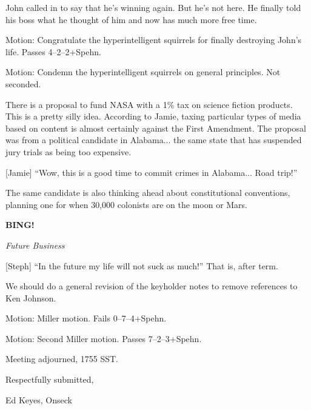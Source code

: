 \documentclass[12pt]{article}
\newcommand{\bing}{{\bf BING!} }
\newcommand{\goto}[1]{\bing \vskip 12pt \centerline{{\em{#1}}}}
\begin{document}
John called in to say that he's winning again.  But he's not here.
He finally told his boss what he thought of him and now has much more
free time.

Motion: Congratulate the hyperintelligent squirrels for finally
destroying John's life.  Passes 4--2--2+Spehn.

Motion: Condemn the hyperintelligent squirrels on general principles.
Not seconded.

There is a proposal to fund NASA with a 1\% tax on science fiction
products.  This is a pretty silly idea.  According to Jamie, taxing
particular types of media based on content is almost certainly against
the First Amendment.  The proposal was from a political candidate in
Alabama... the same state that has suspended jury trials as being too
expensive.

[Jamie] ``Wow, this is a good time to commit crimes in Alabama...
Road trip!''

The same candidate is also thinking ahead about constitutional conventions,
planning one for when 30,000 colonists are on the moon or Mars.

\goto{Future Business}

[Steph] ``In the future my life will not suck as much!''  That is,
after term.

We should do a general revision of the keyholder notes to remove
references to Ken Johnson.

Motion: Miller motion.  Fails 0--7--4+Spehn.

Motion: Second Miller motion.  Passes 7--2--3+Spehn.

\vspace{12pt}

\noindent
Meeting adjourned, 1755 SST.

\vspace{18pt}

\centerline{Respectfully submitted,}
\centerline{Ed Keyes, Onseck}
\end{document}
